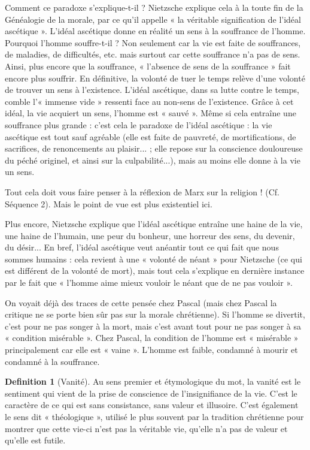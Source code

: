 \documentclass[french]{book}
\theoremstyle{definition}
\newtheorem*{dfn}{Definition}
\begin{document}
Comment ce paradoxe s’explique-t-il ? Nietzsche explique cela à la toute fin de la Généalogie de la morale, par ce qu’il appelle « la véritable signification de l’idéal ascétique ». L’idéal ascétique donne en réalité un sens à la souffrance de l’homme. Pourquoi l’homme souffre-t-il ? Non seulement car la vie est faite de souffrances, de maladies, de difficultés, etc. mais surtout car cette souffrance n’a pas de sens. Ainsi, plus encore que la
souffrance, « l’absence de sens de la souffrance » fait encore plus souffrir. En définitive, la volonté de tuer le temps relève d’une volonté de trouver un sens à l’existence. L’idéal ascétique, dans sa lutte contre le temps, comble l’« immense vide » ressenti face au non-sens de l’existence. Grâce à cet idéal, la vie acquiert un sens, l’homme est « sauvé ». Même si cela entraîne une souffrance plus grande : c’est cela le paradoxe de l’idéal ascétique : la vie ascétique est tout sauf agréable (elle est faite de pauvreté, de mortifications, de sacrifices, de renoncements au plaisir... ; elle repose sur la conscience douloureuse du péché originel, et ainsi sur la culpabilité...), mais au moins elle donne à la vie un sens.

Tout cela doit vous faire penser à la réflexion de Marx sur la religion ! (Cf. Séquence 2). Mais le point de vue est plus existentiel ici.

Plus encore, Nietzsche explique que l’idéal ascétique entraîne une haine de la vie, une haine de l’humain, une peur du bonheur, une horreur des sens, du devenir, du désir... En bref, l’idéal ascétique veut anéantir tout ce qui fait que nous sommes humains : cela revient à une « volonté de néant » pour Nietzsche (ce qui est différent de la volonté de mort), mais tout cela s’explique en dernière instance par le fait que « l’homme aime mieux vouloir le néant que de ne pas vouloir ».

On voyait déjà des traces de cette pensée chez Pascal (mais chez Pascal la critique ne se porte bien sûr pas sur la morale chrétienne). Si l’homme se divertit, c’est pour ne pas songer à la mort, mais c’est avant tout pour ne pas songer à sa « condition misérable ». Chez Pascal, la condition de l’homme est « misérable » principalement car elle est « vaine ». L’homme est faible, condamné à mourir et condamné à la souffrance.

\begin{dfn}[Vanité]
Au sens premier et étymologique du mot, la vanité est le sentiment qui vient de la prise de conscience de l’insignifiance de la vie. C’est le caractère de ce qui est sans consistance, sans valeur et illusoire. C’est également le sens dit « théologique », utilisé le plus souvent par la tradition chrétienne pour montrer que cette vie-ci n’est pas la véritable vie, qu’elle n’a pas de valeur et qu’elle est futile.
\end{dfn}
\end{document}
